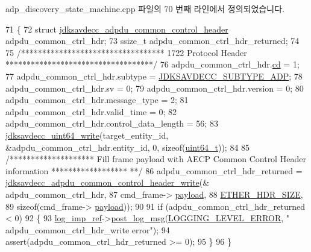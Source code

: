 adp\+\_\+discovery\+\_\+state\+\_\+machine.\+cpp 파일의 70 번째 라인에서 정의되었습니다.


\begin{DoxyCode}
71 \{
72     \textcolor{keyword}{struct }\hyperlink{structjdksavdecc__adpdu__common__control__header}{jdksavdecc\_adpdu\_common\_control\_header} 
      adpdu\_common\_ctrl\_hdr;
73     ssize\_t adpdu\_common\_ctrl\_hdr\_returned;
74 
75     \textcolor{comment}{/********************************** 1722 Protocol Header ***********************************/}
76     adpdu\_common\_ctrl\_hdr.\hyperlink{structjdksavdecc__adpdu__common__control__header_a9bdcd90bda4a8763700a1d59c27a6a26}{cd} = 1;
77     adpdu\_common\_ctrl\_hdr.subtype = \hyperlink{group__subtype_gad332b6f1f3f41f705c04917256c26761}{JDKSAVDECC\_SUBTYPE\_ADP};
78     adpdu\_common\_ctrl\_hdr.sv = 0;
79     adpdu\_common\_ctrl\_hdr.version = 0;
80     adpdu\_common\_ctrl\_hdr.message\_type = 2;
81     adpdu\_common\_ctrl\_hdr.valid\_time = 0;
82     adpdu\_common\_ctrl\_hdr.control\_data\_length = 56;
83     \hyperlink{group__endian_gaa294fd85c2d887032dad294c6833c903}{jdksavdecc\_uint64\_write}(target\_entity\_id, &adpdu\_common\_ctrl\_hdr.entity\_id, 0, \textcolor{keyword}{
      sizeof}(\hyperlink{parse_8c_aec6fcb673ff035718c238c8c9d544c47}{uint64\_t}));
84 
85     \textcolor{comment}{/******************** Fill frame payload with AECP Common Control Header information ******************
      **/}
86     adpdu\_common\_ctrl\_hdr\_returned = 
      \hyperlink{group__adpdu_ga6c65125a66fce45f38751f7c6731254d}{jdksavdecc\_adpdu\_common\_control\_header\_write}(&
      adpdu\_common\_ctrl\_hdr,
87                                                                                   cmd\_frame->
      \hyperlink{structjdksavdecc__frame_a220ad076814a31ae0163e722e523de46}{payload},
88                                                                                   
      \hyperlink{namespaceavdecc__lib_a6c827b1a0d973e18119c5e3da518e65ca9512ad9b34302ba7048d88197e0a2dc0}{ETHER\_HDR\_SIZE},
89                                                                                   \textcolor{keyword}{sizeof}(cmd\_frame->
      \hyperlink{structjdksavdecc__frame_a220ad076814a31ae0163e722e523de46}{payload}));
90 
91     \textcolor{keywordflow}{if} (adpdu\_common\_ctrl\_hdr\_returned < 0)
92     \{
93         \hyperlink{namespaceavdecc__lib_acbe3e2a96ae6524943ca532c87a28529}{log\_imp\_ref}->\hyperlink{classavdecc__lib_1_1log_a68139a6297697e4ccebf36ccfd02e44a}{post\_log\_msg}(\hyperlink{namespaceavdecc__lib_a501055c431e6872ef46f252ad13f85cdaf2c4481208273451a6f5c7bb9770ec8a}{LOGGING\_LEVEL\_ERROR}, \textcolor{stringliteral}{"
      adpdu\_common\_ctrl\_hdr\_write error"});
94         assert(adpdu\_common\_ctrl\_hdr\_returned >= 0);
95     \}
96 \}
\end{DoxyCode}


